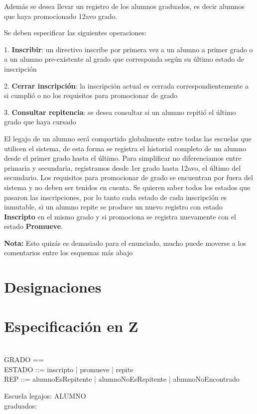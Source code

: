 \documentclass{article}
\begin{document}
Además se desea llevar un registro de los alumnos graduados, es decir alumnos que haya promocionado 12avo grado.

Se deben especificar las siguientes operaciones:

1. \textbf{Inscribir}: un directivo inscribe por primera vez a un alumno a primer grado o a un alumno pre-existente al grado que corresponda según su último estado de inscripción

2. \textbf{Cerrar inscripción}: la inscripción actual es cerrada correspondientemente a si cumplió o no los requisitos para promocionar de grado

3. \textbf{Consultar repitencia}: se desea consultar si un alumno repitió el último grado que haya cursado

El legajo de un alumno será compartido globalmente entre todas las escuelas que utilicen el sistema, de esta forma se registra el historial completo de un alumno desde el primer grado hasta el último.
Para simplificar no diferenciamos entre primaria y secundaria, registramos desde 1er grado hasta 12avo, el último del secundario. Los requisitos para promocionar de grado se encuentran por fuera del sistema y no deben ser tenidos en cuenta.
Se quieren saber todos los estados que pasaron las inscripciones, por lo tanto cada estado de cada inscripción es inmutable, si un alumno repite se produce un nuevo registro con estado \textbf{Inscripto} en el mismo grado y si promociona se registra nuevamente con el estado \textbf{Promueve}.

\textbf{Nota:} Esto quizás es demasiado para el enunciado, mucho puede moverse a los comentarios entre los esquemas más abajo

\section*{Designaciones}

\section*{Especificación en Z}
  \begin{zed}
    [ALUMNO] \\
    GRADO == \nat \\
    ESTADO ::= inscripto | promueve | repite \\
    REP ::= alumnoEsRepitente | alumnoNoEsRepitente | alumnoNoEncontrado
  \end{zed}
  
  \begin{schema}{Escuela}
    legajos: ALUMNO \pfun {} \\
    graduados: 
  \end{schema}
\end{document}
